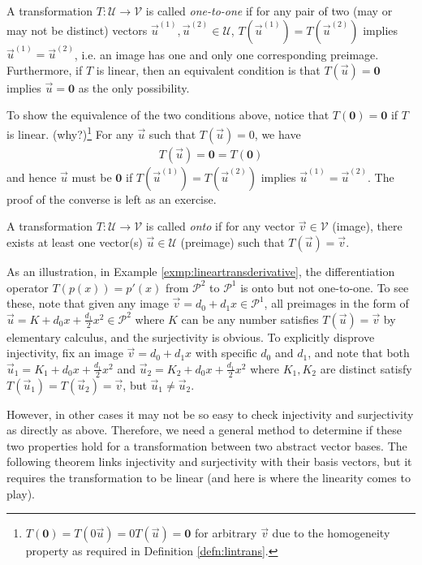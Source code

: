 \begin{proper}
\label{proper:injective}
A transformation $T: \mathcal{U} \to \mathcal{V}$ is called \textit{one-to-one} if for any pair of two (may or may not be distinct) vectors $\vec{u}^{(1)}, \vec{u}^{(2)} \in \mathcal{U}$, $T(\vec{u}^{(1)}) = T(\vec{u}^{(2)})$ implies $\vec{u}^{(1)} = \vec{u}^{(2)}$, i.e. an image has one and only one corresponding preimage. Furthermore, if $T$ is linear, then an equivalent condition is that $T(\vec{u}) = \textbf{0}$ implies $\vec{u} = \textbf{0}$ as the only possibility.
\end{proper}
To show the equivalence of the two conditions above, notice that $T(\textbf{0}) = \textbf{0}$ if $T$ is linear. (why?)\footnote{$T(\textbf{0})=T(0\vec{u})=0T(\vec{u})=\textbf{0}$ for arbitrary $\vec{v}$ due to the homogeneity property as required in Definition \ref{defn:lintrans}.} For any $\vec{u}$ such that $T(\vec{u}) = 0$, we have
\begin{align*}
T(\vec{u}) = \textbf{0} = T(\textbf{0})
\end{align*}
and hence $\vec{u}$ must be $\textbf{0}$ if $T(\vec{u}^{(1)}) = T(\vec{u}^{(2)})$ implies $\vec{u}^{(1)} = \vec{u}^{(2)}$. The proof of the converse is left as an exercise.
\begin{proper}
\label{proper:surjective}
A transformation $T: \mathcal{U} \to \mathcal{V}$ is called \textit{onto} if for any vector $\vec{v} \in \mathcal{V}$ (image), there exists at least one vector(s) $\vec{u} \in \mathcal{U}$ (preimage) such that $T(\vec{u}) = \vec{v}$.
\end{proper}
As an illustration, in Example \ref{exmp:lineartransderivative}, the differentiation operator $T(p(x)) = p'(x)$ from $\mathcal{P}^2$ to $\mathcal{P}^1$ is onto but not one-to-one. To see these, note that given any image $\vec{v} = d_0 + d_1x \in \mathcal{P}^1$, all preimages in the form of $\vec{u} = K + d_0x + \frac{d_1}{2}x^2\in \mathcal{P}^2$ where $K$ can be any number satisfies $T(\vec{u}) = \vec{v}$ by elementary calculus, and the surjectivity is obvious. To explicitly disprove injectivity, fix an image $\vec{v} = d_0 + d_1x$ with specific $d_0$ and $d_1$, and note that both $\vec{u}_1 = K_1 + d_0x + \frac{d_1}{2}x^2$ and $\vec{u}_2 = K_2 + d_0x + \frac{d_1}{2}x^2$ where $K_1, K_2$ are distinct satisfy $T(\vec{u}_1) = T(\vec{u}_2) = \vec{v}$, but $\vec{u}_1 \neq \vec{u}_2$.

However, in other cases it may not be so easy to check injectivity and surjectivity as directly as above. Therefore, we need a general method to determine if these two properties hold for a transformation between two abstract vector bases. The following theorem links injectivity and surjectivity with their basis vectors, but it requires the transformation to be linear (and here is where the linearity comes to play).

